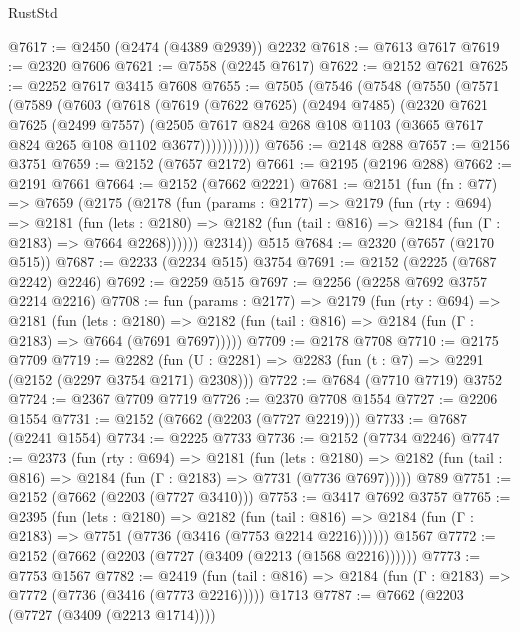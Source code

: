 \begin{lexlean}{RustStd}
\begin{coremodule}
@7617 := @2450 (@2474 (@4389 @2939)) @2232
@7618 := @7613 @7617
@7619 := @2320 @7606
@7621 := @7558 (@2245 @7617)
@7622 := @2152 @7621
@7625 := @2252 @7617 @3415 @7608
@7655 := @7505
    (@7546
      (@7548
        (@7550
          (@7571
            (@7589
              (@7603
                (@7618
                  (@7619
                    (@7622 @7625)
                    (@2494 @7485)
                    (@2320
                      @7621
                      @7625
                      (@2499 @7557)
                      (@2505
                        @7617
                        @824
                        @268
                        @108
                        @1103
                        (@3665 @7617 @824 @265 @108 @1102 @3677)))))))))))
@7656 := @2148 @288
@7657 := @2156 @3751
@7659 := @2152 (@7657 @2172)
@7661 := @2195 (@2196 @288)
@7662 := @2191 @7661
@7664 := @2152 (@7662 @2221)
@7681 := @2151
    (fun (fn : @77) =>
    @7659
      (@2175
        (@2178
          (fun (params : @2177) =>
          @2179
            (fun (rty : @694) =>
            @2181
              (fun (lets : @2180) =>
              @2182 (fun (tail : @816) => @2184 (fun (Γ : @2183) => @7664 @2268))))))
        @2314))
    @515
@7684 := @2320 (@7657 (@2170 @515))
@7687 := @2233 (@2234 @515) @3754
@7691 := @2152 (@2225 (@7687 @2242) @2246)
@7692 := @2259 @515
@7697 := @2256 (@2258 @7692 @3757 @2214 @2216)
@7708 := fun (params : @2177) =>
  @2179
    (fun (rty : @694) =>
    @2181
      (fun (lets : @2180) =>
      @2182 (fun (tail : @816) => @2184 (fun (Γ : @2183) => @7664 (@7691 @7697)))))
@7709 := @2178 @7708
@7710 := @2175 @7709
@7719 := @2282 (fun (U : @2281) => @2283 (fun (t : @7) => @2291 (@2152 (@2297 @3754 @2171) @2308)))
@7722 := @7684 (@7710 @7719) @3752
@7724 := @2367 @7709 @7719
@7726 := @2370 @7708 @1554
@7727 := @2206 @1554
@7731 := @2152 (@7662 (@2203 (@7727 @2219)))
@7733 := @7687 (@2241 @1554)
@7734 := @2225 @7733
@7736 := @2152 (@7734 @2246)
@7747 := @2373
    (fun (rty : @694) =>
    @2181
      (fun (lets : @2180) =>
      @2182 (fun (tail : @816) => @2184 (fun (Γ : @2183) => @7731 (@7736 @7697)))))
    @789
@7751 := @2152 (@7662 (@2203 (@7727 @3410)))
@7753 := @3417 @7692 @3757
@7765 := @2395
    (fun (lets : @2180) =>
    @2182
      (fun (tail : @816) => @2184 (fun (Γ : @2183) => @7751 (@7736 (@3416 (@7753 @2214 @2216))))))
    @1567
@7772 := @2152 (@7662 (@2203 (@7727 (@3409 (@2213 (@1568 @2216))))))
@7773 := @7753 @1567
@7782 := @2419
    (fun (tail : @816) => @2184 (fun (Γ : @2183) => @7772 (@7736 (@3416 (@7773 @2216)))))
    @1713
@7787 := @7662 (@2203 (@7727 (@3409 (@2213 @1714))))

\end{coremodule}
\end{lexlean}
